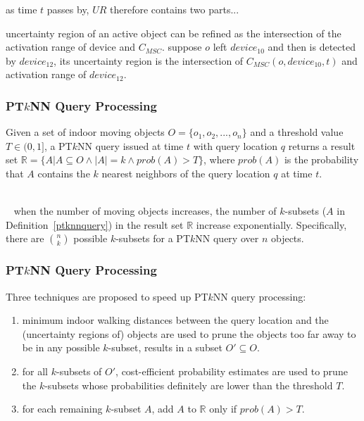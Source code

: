 \begin{frame}
\begin{columns}[c]
\end{columns}

\begin{fitemize}
  \item as time ${t}$ passes by, ${UR}$ therefore contains two parts...
  \item uncertainty region of an active object can be refined as the intersection of the activation range of device and ${C_{MSC}}$. suppose ${o}$ left ${device_{10}}$ and then is detected by ${device_{12}}$, its uncertainty region is the intersection of ${C_{MSC}(o, device_{10}, t)}$ and activation range of ${device_{12}}$.
\end{fitemize}

\end{frame}


\begin{frame}
\frametitle{PT$k$NN Query Processing}

\begin{definition}
  \label{ptknnquery}
  \textrm{Given a set of indoor moving objects ${O = \{ o_1, o_2,...,o_n \}}$ and a threshold value ${T \in (0,1]}$, a PT${k}$NN query issued at time ${t}$ with query location ${q}$ returns a result set $\mathbb{R} = {\{ A | A \subseteq O \wedge |A| = k \wedge prob(A) > T \} }$, where ${prob(A)}$ is the probability that ${A}$ contains the ${k}$ nearest neighbors of the query location ${q}$ at time ${t}$.}
\end{definition}

~\\~
\small{when the number of moving objects increases, the number of ${k}$-subsets (${A}$ in Definition~\ref{ptknnquery}) in the result set $\mathbb{R}$ increase exponentially. Specifically, there are ${\binom{n}{k}}$ possible ${k}$-subsets for a PT${k}$NN query over ${n}$ objects.}

\end{frame}


\begin{frame}
\frametitle{PT$k$NN Query Processing}

\large{Three techniques are proposed to speed up PT$k$NN query processing:}
\begin{enumerate}
  \item minimum indoor walking distances between the query location and the (uncertainty regions of) objects are used to prune the objects too far away to be in any possible ${k}$-subset, results in a subset ${O' \subseteq O}$.
  \item for all ${k}$-subsets of ${O'}$, cost-efficient probability estimates are used to prune the ${k}$-subsets whose probabilities definitely are lower than the threshold ${T}$.
  \item for each remaining ${k}$-subset ${A}$, add ${A}$ to $\mathbb{R}$ only if ${prob(A) > T}$.
\end{enumerate}

\end{frame}

